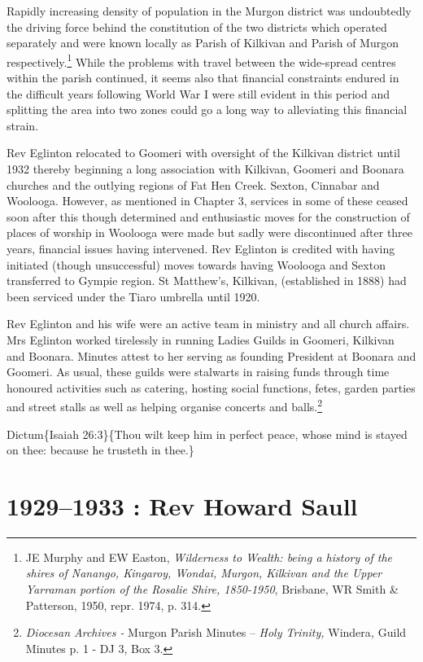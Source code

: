 Rapidly increasing density of population in the Murgon district was undoubtedly the driving force behind the constitution of the two districts which operated separately and were known locally as Parish of Kilkivan and Parish of Murgon respectively.\footnote{JE Murphy and EW Easton, \emph{Wilderness to Wealth: being a history of the shires of Nanango, Kingaroy, Wondai, Murgon, Kilkivan and the Upper Yarraman portion of the Rosalie Shire, 1850-1950}, Brisbane, WR Smith \& Patterson, 1950, repr. 1974, p. 314.} While the problems with travel between the wide-spread centres within the parish continued, it seems also that financial constraints endured in the difficult years following World War I were still evident in this period and splitting the area into two zones could go a long way to alleviating this financial strain.

Rev Eglinton relocated to Goomeri with oversight of the Kilkivan district until 1932 thereby beginning a long association with Kilkivan, Goomeri and Boonara churches and the outlying regions of Fat Hen Creek. Sexton, Cinnabar and Woolooga. However, as mentioned in Chapter 3, services in some of these ceased soon after this though determined and enthusiastic moves for the construction of places of worship in Woolooga were made but sadly were discontinued after three years, financial issues having intervened. Rev Eglinton is credited with having initiated (though unsuccessful) moves towards having Woolooga and Sexton transferred to Gympie region. St Matthew's, Kilkivan, (established in 1888) had been serviced under the Tiaro umbrella until 1920.

Rev Eglinton and his wife were an active team in ministry and all church affairs. Mrs Eglinton worked tirelessly in running Ladies Guilds in Goomeri, Kilkivan and Boonara. Minutes attest to her serving as founding President at Boonara and Goomeri. As usual, these guilds were stalwarts in raising funds through time honoured activities such as catering, hosting social functions, fetes, garden parties and street stalls as well as helping organise concerts and balls.\footnote{\emph{Diocesan Archives -} Murgon Parish Minutes -- \emph{Holy Trinity,} Windera\emph{,} Guild Minutes p. 1 - DJ 3, Box 3.}

Dictum\{Isaiah 26:3\}\{Thou wilt keep him in perfect peace, whose mind is stayed on thee: because he trusteth in thee.\}

\hypertarget{rev-howard-saull}{%
\chapter{1929--1933 : Rev Howard Saull}\label{rev-howard-saull}}

